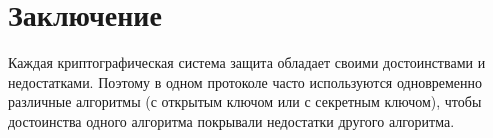 \section{Заключение}

Каждая криптографическая система защита обладает своими достоинствами и недостатками. Поэтому в одном протоколе часто используются одновременно различные алгоритмы (с открытым ключом или с секретным ключом), чтобы достоинства одного алгоритма покрывали недостатки другого алгоритма.
